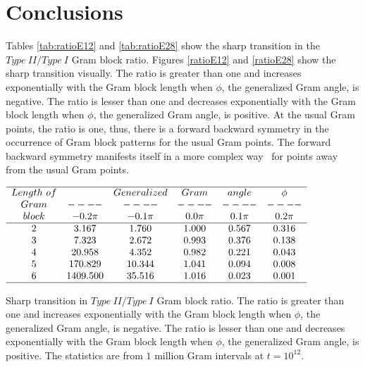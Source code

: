 \documentclass[twoside]{article}
\begin{document}
\section{\label{conclusions}Conclusions}
Tables \ref{tab:ratioE12} and \ref{tab:ratioE28} show the sharp transition in the $Type~II/Type~I$ Gram block ratio.
Figures \ref{ratioE12} and \ref{ratioE28} show the sharp transition visually.
The ratio is greater than one and increases exponentially with the
Gram block length when $\phi$, the generalized Gram angle, is negative.
The ratio is lesser than one and decreases exponentially with the
Gram block length when $\phi$, the generalized Gram angle, is positive.
At the usual Gram points, the ratio is one, thus, there is a forward backward symmetry in the occurrence of Gram block patterns for the usual Gram points. The forward backward symmetry manifests itself in a more complex way~\cite{Shanker 2020}  for points away from the usual Gram points.

\begin{table}
\centering \(\begin{array}{cccccc}
\hline
Length~of  && Generalized &Gram&angle &\phi \\
Gram     &----&----&----&----&----\\
block  & -0.2\pi & -0.1\pi & 0.0\pi & 0.1\pi & 0.2\pi  \\
\hline
2 &3.167 &1.760 &1.000 &0.567 &0.316 \\
3 &7.323 &2.672 &0.993 &0.376 &0.138 \\
4 &20.958 &4.352 &0.982 &0.221 &0.043 \\
5 &170.829 &10.344 &1.041 &0.094 &0.008 \\
6 &1409.500 &35.516 &1.016 &0.023 &0.001 \\
\hline
\end{array}\)
\caption{Sharp transition in $Type~II/Type~I$ Gram block ratio.
The ratio is greater than one and increases exponentially with the
Gram block length when $\phi$, the generalized Gram angle, is negative.
The ratio is lesser than one and decreases exponentially with the
Gram block length when $\phi$, the generalized Gram angle, is positive.
The statistics are from $1$ million Gram intervals at $t=10^{12}$.}
\label{tab:ratioE12}
\end{table}
\end{document}
